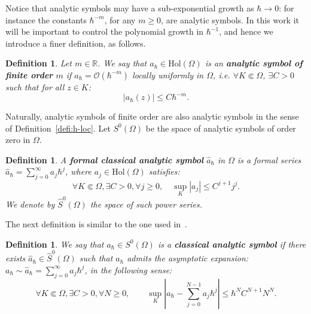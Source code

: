 \documentclass{article}
\newtheorem{defi}[theo]{Definition}
\newcommand{\Hol}{\mathrm{Hol}}
\newcommand{\abs}[1]{\left|#1\right|}
\newcommand{\h}{\hbar}
\begin{document}
Notice that analytic symbols may have a sub-exponential growth as
$\h\to 0$: for instance the constants $\h^{-m}$, for any $m\geq 0$,
are analytic symbols. In this work it will be important to control the
polynomial growth in $\h^{-1}$, and hence we introduce a finer
definition, as follows.
\begin{defi}
  \label{defi:symbol-finite-order}
  Let $m \in \mathbb{R}$. We say that $a_{ \hbar}\in\Hol(\Omega)$ is
  an \textbf{analytic symbol of finite order} $m$ if
  $a_{ \hbar} = \mathcal{O}(\hbar^{-m})$ locally uniformly in
  $ \Omega$, \textit{i.e.}  $ \forall K \Subset \Omega$,
  $ \exists C>0$ such that for all $z \in K$:
  \[
  |a_{ \hbar}(z)| \leq C \hbar^{-m}.
  \]
\end{defi}
Naturally, analytic symbols of finite order are also analytic symbols
in the sense of Definition~\ref{defi:h-loc}. Let $S^0(\Omega)$ be the
space of analytic symbols of order zero in $\Omega$.
\begin{defi}
  \label{defi:formal}
  A \textbf{formal classical analytic symbol} $\hat{a}_\h$ in $\Omega$
  is a formal series $\hat{a}_\h=\sum_{j=0}^\infty a_j \h^j$, where
  $a_j\in\Hol(\Omega)$ satisfies:
  \[
  \forall K \Subset \Omega, \exists C>0,\forall j\geq 0, \quad
  \sup_K\abs{a_j}\leq C^{j+1}j^j.
  \]
  We denote by $\hat S^0(\Omega)$ the space of such power series.
\end{defi}
The next definition is similar to the one used in~\cite[Definition
2.1]{boutet-kree-67}.
\begin{defi}
  \label{defi:cas}
  We say that $a_{ \hbar}\in S^0(\Omega)$ is a \textbf{classical
    analytic symbol} if there exists $\hat a_\h\in \hat S^0(\Omega)$
  such that $a_{ \hbar}$ admits the asymptotic expansion:
  $a_{ \hbar} \sim \hat{a}_{\hbar} = \sum_{j=0}^{ \infty} a_j
  \hbar^j$, in the following sense:
  \begin{equation}
    \label{eq_classical_symbol} \forall K \Subset \Omega, \exists C>0,
    \forall N\geq 0, \quad \quad \sup_K\abs{a_\h - \sum_{j=0}^{N-1}
      a_j \hbar^j}\leq \h^NC^{N+1}N^N.
  \end{equation}
\end{defi}
\end{document}
